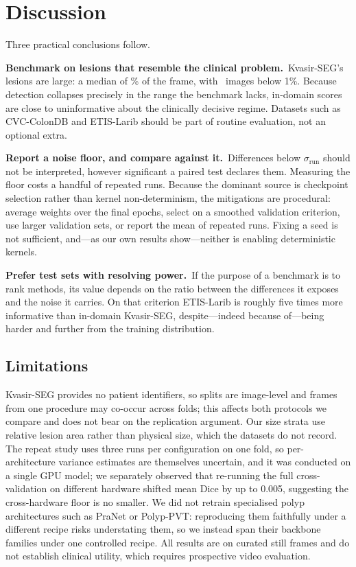 \documentclass[journal]{IEEEtran}
\begin{document}
\section{Discussion}

Three practical conclusions follow.

\smallskip\noindent\textbf{Benchmark on lesions that resemble the clinical problem.}\ 
Kvasir-SEG's lesions are large: a median of \kvasirMedianArea\% of the frame,
with \nSmallKvasir\ images below 1\%. Because detection collapses precisely
in the range the benchmark lacks, in-domain scores are close to uninformative
about the clinically decisive regime. Datasets such as CVC-ColonDB and
ETIS-Larib should be part of routine evaluation, not an optional extra.

\smallskip\noindent\textbf{Report a noise floor, and compare against it.}\ 
Differences below $\sigma_{\mathrm{run}}$ should not be interpreted, however
significant a paired test declares them. Measuring the floor costs a handful
of repeated runs. Because the dominant source is checkpoint selection rather
than kernel non-determinism, the mitigations are procedural: average weights
over the final epochs, select on a smoothed validation criterion, use larger
validation sets, or report the mean of repeated runs. Fixing a seed is not
sufficient, and---as our own results show---neither is enabling deterministic
kernels.

\smallskip\noindent\textbf{Prefer test sets with resolving power.}\ 
If the purpose of a benchmark is to rank methods, its value depends on the
ratio between the differences it exposes and the noise it carries. On that
criterion ETIS-Larib is roughly five times more informative than in-domain
Kvasir-SEG, despite---indeed because of---being harder and further from the
training distribution.

\subsection{Limitations}

Kvasir-SEG provides no patient identifiers, so splits are image-level and
frames from one procedure may co-occur across folds; this affects both
protocols we compare and does not bear on the replication argument. Our
size strata use relative lesion area rather than physical size, which the
datasets do not record. The repeat study uses three runs per configuration on
one fold, so per-architecture variance estimates are themselves uncertain,
and it was conducted on a single GPU model; we separately observed that
re-running the full cross-validation on different hardware shifted mean Dice
by up to 0.005, suggesting the cross-hardware floor is no smaller. We did not
retrain specialised polyp architectures such as PraNet or Polyp-PVT:
reproducing them faithfully under a different recipe risks understating them,
so we instead span their backbone families under one controlled recipe. All
results are on curated still frames and do not establish clinical utility,
which requires prospective video evaluation.
\end{document}
